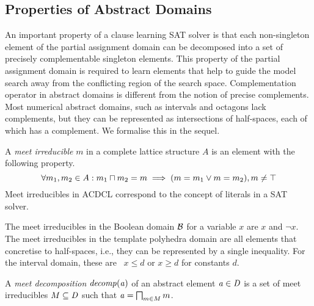 \subsection{Properties of Abstract Domains}
%
An important property of a clause learning SAT solver is that each
non-singleton element of the partial assignment domain can be 
decomposed into a set of precisely complementable singleton elements.  
This property of the partial assignment domain is required to learn 
elements that help to guide the model search away from the
conflicting region of the search space.  Complementation operator 
in abstract domains is different from the notion of precise complements. 
%
Most numerical abstract domains, such as intervals and octagons lack
complements, but they can be represented as intersections of
half-spaces, each of which has a complement. 
%
We formalise this in the sequel.
%
\begin{definition} 
A \emph{meet irreducible} $m$ in a complete lattice 
structure $A$ is an element with the following property.
\begin{equation}
\forall m_1, m_2 \in A: m_1 \sqcap m_2 = m \implies (m = m_1 \lor m = m_2), m \neq \top  
\end{equation}
Meet irreducibles in ACDCL correspond to the concept of literals in a SAT solver.
\end{definition}
%
The meet irreducibles in the Boolean domain $\mathcal{B}$ for a variable $x$ are 
$x$ and $\neg x$. The meet 
irreducibles in the template polyhedra domain are all elements 
that concretise to half-spaces, i.e., they can be represented 
by a single inequality. For the interval domain, these are 
\ $x \leq d$ or $x \geq d$ for constants $d$. 


\begin{definition}
A \emph{meet decomposition} ${\mathit{decomp}}(\mathit{a})$ of an abstract
element $\mathit{a} \in \mathit{D}$ is a set of meet irreducibles $M \subseteq \mathit{D}$ such that 
$\mathit{a}=\bigsqcap_{m\in M} m$.
\end{definition}

